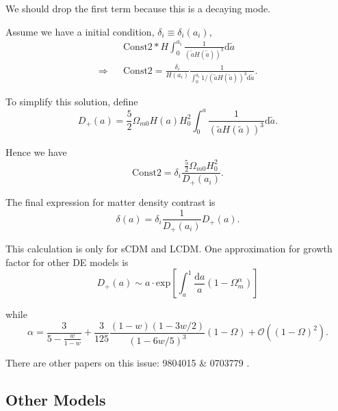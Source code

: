 \documentclass{article}
\begin{document}
We should drop the first term because this is a decaying mode.


Assume we have a initial condition, $\delta_i\equiv\delta_{i}(a_{i})$,
\begin{eqnarray}
&& \text{Const2}*H\int_0^{a_i}\frac{1}{(\tilde a H(\tilde a))^3}\mathrm d\tilde a \\
\Rightarrow && \text{Const2}=\frac{\delta_i}{H(a_i)}\frac{1}{\int_0^{a_i}1/(\tilde a H(\tilde a))^3\mathrm d\tilde a}    .
\end{eqnarray}

To simplify this solution, define
\begin{equation}
D_+(a)=\frac 52 \Omega_{m0} H(a)H_0^2\int_0^a\frac{1}{(\tilde a H(\tilde a))^3}\mathrm d\tilde a.\label{eq:GrowthFactorLCDM}
\end{equation}

Hence we have
\begin{equation}
\text{Const2}=\delta_i\frac{\frac 52\Omega_{m0}H_0^2}{D_+(a_i)}.
\end{equation}

The final expression for matter density contrast is
\begin{equation}
\delta(a)=\delta_i\frac{1}{D_+(a_i)}D_+(a).
\end{equation}

{\color{red}

This calculation is only for sCDM and LCDM. One approximation for growth factor for other DE models is 
\begin{equation}
D_+(a)\sim a\cdot \mathrm{exp}[\int_a^1 \frac{\mathrm da}{a}(1-\Omega_m^\alpha)]
\end{equation}

while 
\begin{equation}
\alpha=\frac{3}{5-\frac{w}{1-w}}+\frac{3}{125}\frac{(1-w)(1-3w/2)}{(1-6w/5)^3}(1-\Omega)+\mathcal O((1-\Omega)^2)  .
\end{equation}


There are other papers on this issue:
9804015 \& 0703779 .


}









\subsection{Other Models}
\end{document}
